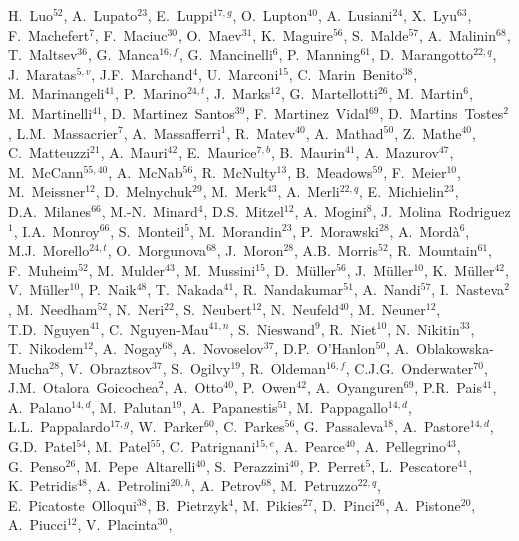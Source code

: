 \begin{flushleft}
H.~Luo$^{52}$,
A.~Lupato$^{23}$,
E.~Luppi$^{17,g}$,
O.~Lupton$^{40}$,
A.~Lusiani$^{24}$,
X.~Lyu$^{63}$,
F.~Machefert$^{7}$,
F.~Maciuc$^{30}$,
O.~Maev$^{31}$,
K.~Maguire$^{56}$,
S.~Malde$^{57}$,
A.~Malinin$^{68}$,
T.~Maltsev$^{36}$,
G.~Manca$^{16,f}$,
G.~Mancinelli$^{6}$,
P.~Manning$^{61}$,
D.~Marangotto$^{22,q}$,
J.~Maratas$^{5,v}$,
J.F.~Marchand$^{4}$,
U.~Marconi$^{15}$,
C.~Marin~Benito$^{38}$,
M.~Marinangeli$^{41}$,
P.~Marino$^{24,t}$,
J.~Marks$^{12}$,
G.~Martellotti$^{26}$,
M.~Martin$^{6}$,
M.~Martinelli$^{41}$,
D.~Martinez~Santos$^{39}$,
F.~Martinez~Vidal$^{69}$,
D.~Martins~Tostes$^{2}$,
L.M.~Massacrier$^{7}$,
A.~Massafferri$^{1}$,
R.~Matev$^{40}$,
A.~Mathad$^{50}$,
Z.~Mathe$^{40}$,
C.~Matteuzzi$^{21}$,
A.~Mauri$^{42}$,
E.~Maurice$^{7,b}$,
B.~Maurin$^{41}$,
A.~Mazurov$^{47}$,
M.~McCann$^{55,40}$,
A.~McNab$^{56}$,
R.~McNulty$^{13}$,
B.~Meadows$^{59}$,
F.~Meier$^{10}$,
M.~Meissner$^{12}$,
D.~Melnychuk$^{29}$,
M.~Merk$^{43}$,
A.~Merli$^{22,q}$,
E.~Michielin$^{23}$,
D.A.~Milanes$^{66}$,
M.-N.~Minard$^{4}$,
D.S.~Mitzel$^{12}$,
A.~Mogini$^{8}$,
J.~Molina~Rodriguez$^{1}$,
I.A.~Monroy$^{66}$,
S.~Monteil$^{5}$,
M.~Morandin$^{23}$,
P.~Morawski$^{28}$,
A.~Mord{\`a}$^{6}$,
M.J.~Morello$^{24,t}$,
O.~Morgunova$^{68}$,
J.~Moron$^{28}$,
A.B.~Morris$^{52}$,
R.~Mountain$^{61}$,
F.~Muheim$^{52}$,
M.~Mulder$^{43}$,
M.~Mussini$^{15}$,
D.~M{\"u}ller$^{56}$,
J.~M{\"u}ller$^{10}$,
K.~M{\"u}ller$^{42}$,
V.~M{\"u}ller$^{10}$,
P.~Naik$^{48}$,
T.~Nakada$^{41}$,
R.~Nandakumar$^{51}$,
A.~Nandi$^{57}$,
I.~Nasteva$^{2}$,
M.~Needham$^{52}$,
N.~Neri$^{22}$,
S.~Neubert$^{12}$,
N.~Neufeld$^{40}$,
M.~Neuner$^{12}$,
T.D.~Nguyen$^{41}$,
C.~Nguyen-Mau$^{41,n}$,
S.~Nieswand$^{9}$,
R.~Niet$^{10}$,
N.~Nikitin$^{33}$,
T.~Nikodem$^{12}$,
A.~Nogay$^{68}$,
A.~Novoselov$^{37}$,
D.P.~O'Hanlon$^{50}$,
A.~Oblakowska-Mucha$^{28}$,
V.~Obraztsov$^{37}$,
S.~Ogilvy$^{19}$,
R.~Oldeman$^{16,f}$,
C.J.G.~Onderwater$^{70}$,
J.M.~Otalora~Goicochea$^{2}$,
A.~Otto$^{40}$,
P.~Owen$^{42}$,
A.~Oyanguren$^{69}$,
P.R.~Pais$^{41}$,
A.~Palano$^{14,d}$,
M.~Palutan$^{19}$,
A.~Papanestis$^{51}$,
M.~Pappagallo$^{14,d}$,
L.L.~Pappalardo$^{17,g}$,
W.~Parker$^{60}$,
C.~Parkes$^{56}$,
G.~Passaleva$^{18}$,
A.~Pastore$^{14,d}$,
G.D.~Patel$^{54}$,
M.~Patel$^{55}$,
C.~Patrignani$^{15,e}$,
A.~Pearce$^{40}$,
A.~Pellegrino$^{43}$,
G.~Penso$^{26}$,
M.~Pepe~Altarelli$^{40}$,
S.~Perazzini$^{40}$,
P.~Perret$^{5}$,
L.~Pescatore$^{41}$,
K.~Petridis$^{48}$,
A.~Petrolini$^{20,h}$,
A.~Petrov$^{68}$,
M.~Petruzzo$^{22,q}$,
E.~Picatoste~Olloqui$^{38}$,
B.~Pietrzyk$^{4}$,
M.~Pikies$^{27}$,
D.~Pinci$^{26}$,
A.~Pistone$^{20}$,
A.~Piucci$^{12}$,
V.~Placinta$^{30}$,

\end{flushleft}
